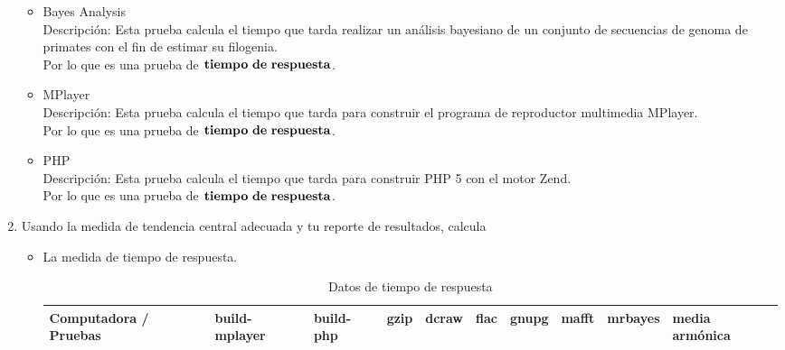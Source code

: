 \documentclass{article}
\begin{document}
\begin{enumerate}
{\begin{itemize}
{                    Descripción: Esta prueba calcula cuánto tiempo tarda realizar una alineación de 100 secuencias de decarboxilasa piruvato.\\
                    Por lo que es una prueba de $\bf{tiempo\ de\ respuesta}$.
                }
                \item {
                    Bayes Analysis \\
                    Descripción: Esta prueba calcula el tiempo que tarda realizar un análisis bayesiano de un conjunto de secuencias de genoma de primates con el fin de estimar su filogenia.\\
                    Por lo que es una prueba de $\bf{tiempo\ de\ respuesta}$.
                }
                \item {
                    MPlayer \\
                    Descripción: Esta prueba calcula el tiempo que tarda para construir el programa de reproductor multimedia MPlayer. \\
                    Por lo que es una prueba de $\bf{tiempo\ de\ respuesta}$.
                }
                \item {
                    PHP \\
                    Descripción: Esta prueba calcula el tiempo que tarda para construir PHP 5 con el motor Zend. \\
                    Por lo que es una prueba de $\bf{tiempo\ de\ respuesta}$.\\

                }
            \end{itemize}
        }
        \item {
            Usando la medida de tendencia central adecuada y tu reporte de 
            resultados, calcula            
            \begin{itemize}
                \item {
                    La medida de tiempo de respuesta.
                    \begin{table}[H]
                        \caption*{Datos de tiempo de respuesta}
                        \begin{tabular}{|l|l|l|l|l|l|l|l|l|l|}
                        \toprule
                        Computadora / Pruebas
                        & \cellcolor[HTML]{DAE8FC}build-mplayer 
                        & \cellcolor[HTML]{DAE8FC}build-php 
                        & \cellcolor[HTML]{DAE8FC}gzip 
                        & \cellcolor[HTML]{DAE8FC}dcraw  
                        & \cellcolor[HTML]{DAE8FC}flac 
                        & \cellcolor[HTML]{DAE8FC}gnupg 
                        & \cellcolor[HTML]{DAE8FC}mafft 
                        & \cellcolor[HTML]{DAE8FC}mrbayes 
                        & \cellcolor[HTML]{DAE8FC}media armónica \\ \hline
            

\end{tabular}
\end{table}}
\end{itemize}}
\end{enumerate}
\end{document}
